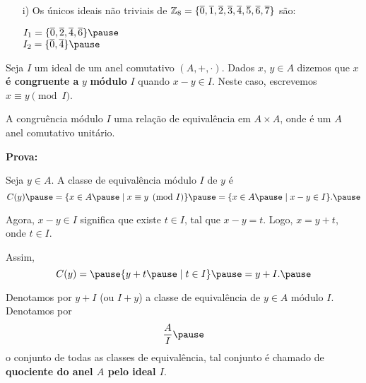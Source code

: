 \documentclass{beamer}
\begin{document}
    \begin{frame}
        \begin{exemplos}
            \begin{enumerate}
                \item[i)] Os {\'u}nicos ideais n{\~a}o triviais de \pause $\mathbb{Z}_8 = \{\overline{0}, \overline{1}, \overline{2}, \overline{3}, \overline{4}, \overline{5}, \overline{6}, \overline{7}\}$ s{\~a}o:\pause
                \begin{center}
                    $I_1 = \{\overline{0}, \overline{2}, \overline{4}, \overline{6}\}\pause$\\
                    $I_2 =\{\overline{0}, \overline{4}\}\pause$
                \end{center}
            \end{enumerate}
        \end{exemplos}
    \end{frame}

    \begin{frame}
        \begin{definicao}
            Seja $I$ um ideal \pause de um anel comutativo $(A, +, \cdot)$. \pause Dados $x$, $y \in A$ \pause dizemos que $x$ \textbf{\'e congruente a} $y$ \pause \textbf{m\'odulo} $I$ \pause quando $x - y \in I$. \pause Neste caso, escrevemos $x\equiv y \pmod I$.\pause
        \end{definicao}

        \begin{proposicao}
            A congru{\^e}ncia m{\'o}dulo $I$  uma rela{\c c}{\~a}o de equival{\^e}ncia em $A \times A$, \pause onde \'e um $A$ anel comutativo unit{\'a}rio.\pause
        \end{proposicao}
        \noindent \textbf{Prova:}

        \vspace{3cm}
    \end{frame}

    \begin{frame}
        Seja $y \in A$. \pause A classe de equival{\^e}ncia m{\'o}dulo $I$ \pause de $y$ {\'e}\pause
        \[
            C(y) \pause = \{x \in A \pause \mid x\equiv y \pmod I\} \pause = \{x \in A \pause \mid x - y \in I\}.\pause
        \]

        Agora, $x - y \in I$ \pause significa que existe $t \in I$, \pause tal que $x - y = t$. \pause Logo, $x = y + t$, \pause onde $t \in I$.\pause

        Assim,\pause
        \[
            C(y) = \pause \{y + t\pause \mid t \in I\} \pause = y + I.\pause
        \]

        \begin{observacao}
            Denotamos por $y + I$ \pause (ou $I + y$) \pause a classe de equival{\^e}ncia de $y \in A$ \pause m{\'o}dulo $I$. \pause Denotamos por \pause
            \[
                \dfrac{A}{I}\pause
            \]
            o conjunto de todas as classes de equival{\^e}ncia, \pause tal conjunto {\'e} chamado de \textbf{quociente do anel $A$ pelo ideal $I$}.\pause
        \end{observacao}
    \end{frame}
\end{document}
